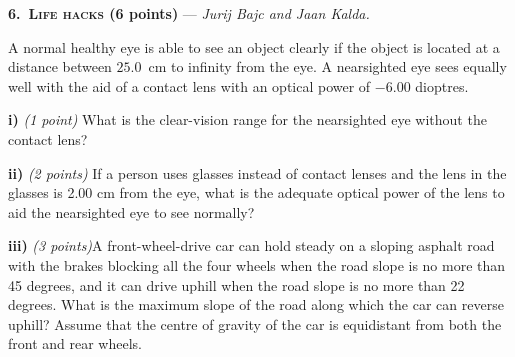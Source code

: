 \textbf{6.\ \textsc{Life hacks} (6 points)} --- \textit{Jurij Bajc and Jaan Kalda.}

A normal healthy eye is able to see an object clearly if the object is located
at a distance between $25.0$~cm to infinity from the eye. A nearsighted eye
sees equally well with the aid of a contact lens with an optical power of
$-6.00$ dioptres.

\textbf{i)} \textit{(1 point)} What is the clear-vision range for the
nearsighted eye without the contact lens?

\textbf{ii)} \textit{(2 points)} If a person uses glasses instead of contact
lenses and the lens in the glasses is 2.00 cm from the eye, what is the
adequate optical power of the lens to aid the nearsighted eye to see normally?

\textbf{iii)} \textit{(3 points)}A front-wheel-drive car can hold steady on a
sloping asphalt road with the brakes blocking all the four wheels when the road
slope is no more than 45 degrees, and it can drive uphill when the road slope is
no more than 22 degrees. What is the maximum slope of the road along which the
car can reverse uphill? Assume that the centre of gravity of the car is
equidistant from both the front and rear wheels.
